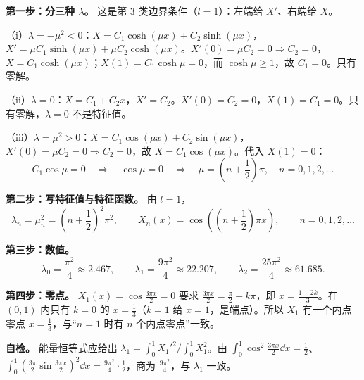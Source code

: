 \documentclass[11pt]{ctexart}
\let\orighdr\hdr
\renewcommand{\hdr}[2]{\needspace{12\baselineskip}\orighdr{#1}{#2}}
\begin{document}

\appendix
{}



\textbf{第一步：分三种 $\lambda$。} 这是第 3 类边界条件（$l=1$）：左端给 $X'$、右端给 $X$。

（i）$\lambda=-\mu^2<0$：$X=C_1\cosh(\mu x)+C_2\sinh(\mu x)$，$X'=\mu C_1\sinh(\mu x)+\mu C_2\cosh(\mu x)$。$X'(0)=\mu C_2=0\Rightarrow C_2=0$，$X=C_1\cosh(\mu x)$；$X(1)=C_1\cosh\mu=0$，而 $\cosh\mu\ge1$，故 $C_1=0$。只有零解。

（ii）$\lambda=0$：$X=C_1+C_2x$，$X'=C_2$。$X'(0)=C_2=0$，$X(1)=C_1=0$。只有零解，$\lambda=0$ 不是特征值。

（iii）$\lambda=\mu^2>0$：$X=C_1\cos(\mu x)+C_2\sin(\mu x)$，$X'(0)=\mu C_2=0\Rightarrow C_2=0$，故 $X=C_1\cos(\mu x)$。代入 $X(1)=0$：
\[
C_1\cos\mu=0\quad\Longrightarrow\quad \cos\mu=0\quad\Longrightarrow\quad \mu=\left(n+\frac12\right)\pi,\quad n=0,1,2,\dots
\]

\textbf{第二步：写特征值与特征函数。} 由 $l=1$，
\[
\lambda_n=\mu_n^2=\left(n+\frac12\right)^2\pi^2,\qquad
X_n(x)=\cos\!\left(\left(n+\frac12\right)\pi x\right),\qquad n=0,1,2,\dots
\]

\textbf{第三步：数值。}
\[
\lambda_0=\frac{\pi^2}{4}\approx2.467,\qquad
\lambda_1=\frac{9\pi^2}{4}\approx22.207,\qquad
\lambda_2=\frac{25\pi^2}{4}\approx61.685 .
\]

\textbf{第四步：零点。} $X_1(x)=\cos\frac{3\pi x}{2}=0$ 要求 $\frac{3\pi x}{2}=\frac{\pi}{2}+k\pi$，即 $x=\frac{1+2k}{3}$。在 $(0,1)$ 内只有 $k=0$ 的 $x=\frac13$（$k=1$ 给 $x=1$，是端点）。所以 $X_1$ 有一个内点零点 $x=\frac13$，与“$n=1$ 时有 $n$ 个内点零点”一致。

\textbf{自检。} 能量恒等式应给出 $\lambda_1=\int_0^1X_1'^2/\int_0^1X_1^2$。由 $\int_0^1\cos^2\frac{3\pi x}{2}\dd x=\frac12$、$\int_0^1\left(\frac{3\pi}{2}\sin\frac{3\pi x}{2}\right)^2\dd x=\frac{9\pi^2}{4}\cdot\frac12$，商为 $\frac{9\pi^2}{4}$，与 $\lambda_1$ 一致。
\end{document}
